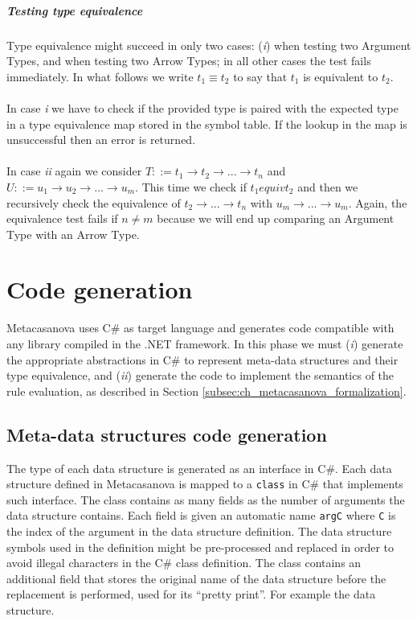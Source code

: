 \subparagraph{Testing type equivalence}

Type equivalence might succeed in only two cases: (\textit{i}) when testing two Argument Types, and when testing two Arrow Types; in all other cases the test fails immediately. In what follows we write $t_1 \equiv t_2$ to say that $t_1$ is equivalent to $t_2$.\\\\
In case \textit{i} we have to check if the provided type is paired with the expected type in a type equivalence map stored in the symbol table. If the lookup in the map is unsuccessful then an error is returned.\\\\
In case \textit{ii} again we consider $T ::= t_1 \rightarrow t_2 \rightarrow ... \rightarrow t_n$ and $U ::= u_1 \rightarrow u_2 \rightarrow ... \rightarrow u_m$. This time we check if $t_1 equiv t_2$ and then we recursively check the equivalence of $t_2 \rightarrow ... \rightarrow t_n$ with $u_m \rightarrow ... \rightarrow u_m$. Again, the equivalence test fails if $n \neq m$ because we will end up comparing an Argument Type with an Arrow Type.

\section{Code generation}
\label{sec:ch_metacasanova_code_generation}
Metacasanova uses C\# as target language and generates code compatible with any library compiled in the .NET framework. In this phase we must (\textit{i}) generate the appropriate abstractions in C\# to represent meta-data structures and their type equivalence, and (\textit{ii}) generate the code to implement the semantics of the rule evaluation, as described in Section \ref{subsec:ch_metacasanova_formalization}.

\subsection{Meta-data structures code generation}
The type of each data structure is generated as an interface in C\#. Each data structure defined in Metacasanova is mapped to a \texttt{class} in C\# that implements such interface. The class contains as many fields as the number of arguments the data structure contains. Each field is given an automatic name \texttt{argC} where \texttt{C} is the index of the argument in the data structure definition. The data structure symbols used in the definition might be pre-processed and replaced in order to avoid illegal characters in the C\# class definition. The class contains an additional field that stores the original name of the data structure before the replacement is performed, used for its ``pretty print''. For example the data structure.


